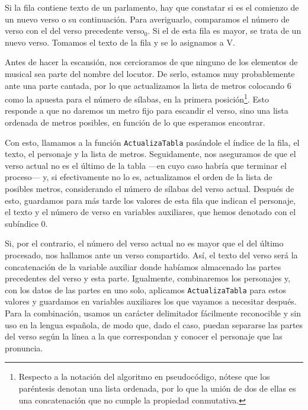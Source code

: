 Si la fila contiene texto de un parlamento, hay que constatar si es el comienzo de un nuevo verso o su continuación. Para averiguarlo, comparamos el número de verso con el del verso precedente {\sans verso$_0$}. Si el de esta fila es mayor, se trata de un nuevo verso. Tomamos el texto de la fila y se lo asignamos a {\sans V}.

Antes de hacer la escansión, nos cercioramos de que ninguno de los elementos de {\sans musical} sea parte del nombre del locutor. De serlo, estamos muy probablemente ante una parte cantada, por lo que actualizamos la lista de metros colocando $6$ como la apuesta para el número de sílabas, en la primera posición\footnote{Respecto a la notación del algoritmo en pseudocódigo, nótese que los paréntesis denotan una lista ordenada, por lo que la unión de dos de ellas es una concatenación que no cumple la propiedad conmutativa.}. Esto responde a que no daremos un metro fijo para escandir el verso, sino una lista ordenada de metros posibles, en función de lo que esperamos encontrar.

Con esto, llamamos a la función \texttt{ActualizaTabla} pasándole el índice de la fila, el texto, el personaje y la lista de metros. Seguidamente, nos aseguramos de que el verso actual no es el último de la tabla —en cuyo caso habría que terminar el proceso— y, si efectivamente no lo es, actualizamos el orden de la lista de posibles metros, considerando el número de sílabas del verso actual. Después de esto, guardamos para más tarde los valores de esta fila que indican el personaje, el texto y el número de verso en variables auxiliares, que hemos denotado con el subíndice $0$.

Si, por el contrario, el número del verso actual no es mayor que el del último procesado, nos hallamos ante un verso compartido. Así, el texto del verso será la concatenación de la variable auxiliar donde habíamos almacenado las partes precedentes del verso y esta parte. Igualmente, combinaremos los personajes y, con los datos de las partes en uno solo, aplicamos \texttt{ActualizaTabla} para estos valores y guardamos en variables auxiliares los que vayamos a necesitar después. Para la combinación, usamos un carácter delimitador fácilmente reconocible y sin uso en la lengua española, de modo que, dado el caso, puedan separarse las partes del verso según la línea a la que correspondan y conocer el personaje que las pronuncia.

